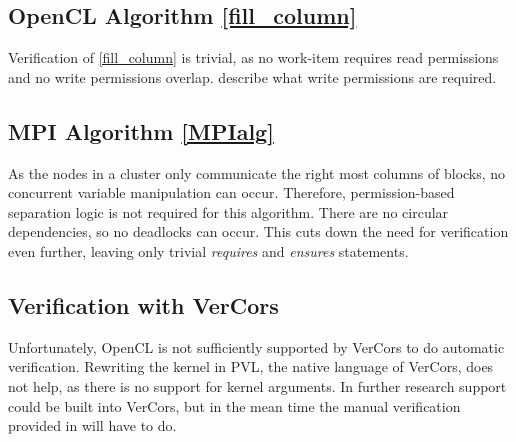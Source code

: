 \subsection{OpenCL Algorithm \ref*{fill_column}} \label{ver:fill_column}
Verification of \cref{fill_column} is trivial, as no work-item requires read permissions and no write permissions overlap.
 describe what write permissions are required.



\subsection{MPI Algorithm \ref*{MPIalg}} \label{ver:MPIalg}
As the nodes in a cluster only communicate the right most columns of blocks, no concurrent variable manipulation can occur.
Therefore, permission-based separation logic is not required for this algorithm.
There are no circular dependencies, so no deadlocks can occur.
This cuts down the need for verification even further, leaving only trivial \textit{requires} and \textit{ensures} statements.

\subsection{Verification with VerCors} \label{ver:vercors}
Unfortunately, OpenCL is not sufficiently supported by VerCors to do automatic verification.
Rewriting the kernel in PVL, the native language of VerCors, does not help, as there is no support for kernel arguments.
In further research support could be built into VerCors, but in the mean time the manual verification provided in  will have to do.
